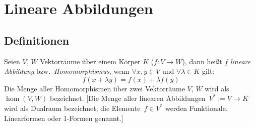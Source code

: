

\chapter{\label{chap:lineare-abbildungen}Lineare Abbildungen}



\section{Definitionen}

Seien $V$, $W$ Vektorräume über einem Körper $K$ ($f:V\to W$), dann heißt $f$ \emph{lineare Abbildung} bzw.~\emph{Homomorphismus},
wenn $\forall x,y\in V$ und $\forall\lambda\in K$ gilt:
\[ f(x+\lambda y)=f(x)+\lambda f(y) \]
Die Menge aller Homomorphismen über zwei Vektorräume $V$, $W$ wird als $\hom(V,W)$ bezeichnet.
[Die Menge aller linearen Abbildungen~$V^* := V \to K$ wird als Dualraum bezeichnet; die Elemente~$f \in V^*$ werden Funktionale, Linearformen oder 1-Formen genannt.]
